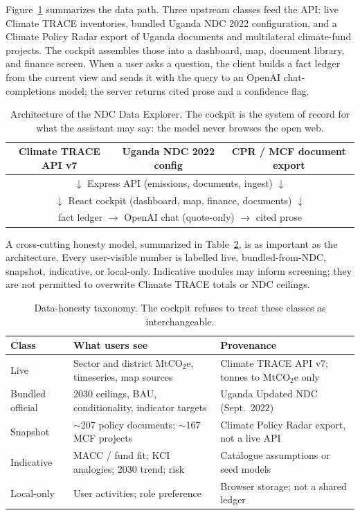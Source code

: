 \documentclass{article}
\begin{document}
Figure~\ref{fig:architecture} summarizes the data path. Three upstream classes feed the API: live Climate TRACE inventories, bundled Uganda NDC 2022 configuration, and a Climate Policy Radar export of Uganda documents and multilateral climate-fund projects. The cockpit assembles those into a dashboard, map, document library, and finance screen. When a user asks a question, the client builds a fact ledger from the current view and sends it with the query to an OpenAI chat-completions model; the server returns cited prose and a confidence flag.

\begin{table}[t]
  \caption{Architecture of the NDC Data Explorer. The cockpit is the system of record for what the assistant may say: the model never browses the open web.}
  \label{fig:architecture}
  \centering
  \small
  \begin{tabular}{ccc}
    \toprule
    Climate TRACE API v7 & Uganda NDC 2022 config & CPR / MCF document export \\
    \midrule
    \multicolumn{3}{c}{$\downarrow$ \quad Express API (emissions, documents, ingest) \quad $\downarrow$} \\
    \multicolumn{3}{c}{$\downarrow$ \quad React cockpit (dashboard, map, finance, documents) \quad $\downarrow$} \\
    \multicolumn{3}{c}{fact ledger $\rightarrow$ OpenAI chat (quote-only) $\rightarrow$ cited prose} \\
    \bottomrule
  \end{tabular}
\end{table}

A cross-cutting honesty model, summarized in Table~\ref{tab:honesty}, is as important as the architecture. Every user-visible number is labelled live, bundled-from-NDC, snapshot, indicative, or local-only. Indicative modules may inform screening; they are not permitted to overwrite Climate TRACE totals or NDC ceilings.

\begin{table}[t]
  \caption{Data-honesty taxonomy. The cockpit refuses to treat these classes as interchangeable.}
  \label{tab:honesty}
  \centering
  \small
  \begin{tabular}{p{}p{}p{}}
    \toprule
    Class & What users see & Provenance \\
    \midrule
    Live & Sector and district MtCO$_2$e, timeseries, map sources & Climate TRACE API v7; tonnes to MtCO$_2$e only \\
    Bundled official & 2030 ceilings, BAU, conditionality, indicator targets & Uganda Updated NDC (Sept.\ 2022) \\
    Snapshot & $\sim$207 policy documents; $\sim$167 MCF projects & Climate Policy Radar export, not a live API \\
    Indicative & MACC / fund fit; KCI analogies; 2030 trend; risk & Catalogue assumptions or seed models \\
    Local-only & User activities; role preference & Browser storage; not a shared ledger \\
    \bottomrule
  \end{tabular}
\end{table}
\end{document}
